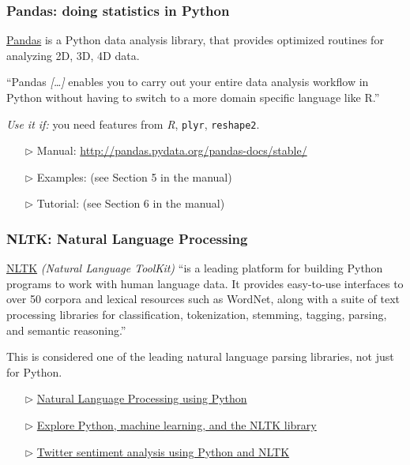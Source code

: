 \documentclass[english,serif,mathserif,xcolor=pdftex,dvipsnames,table]{beamer}
\begin{document}
\begin{frame}[fragile]
  \frametitle{Pandas: doing statistics in Python}

  \href{http://pandas.pydata.org/}{Pandas} is a Python data analysis
  library, that provides optimized routines for analyzing 2D, 3D, 4D
  data.

  \+ ``Pandas \emph{[\ldots]} enables you to carry out your entire
  data analysis workflow in Python without having to switch to a more
  domain specific language like R.''

  \+ \emph{Use it if:} you need features from \emph{R}, \texttt{plyr},
  \texttt{reshape2}.

  \+
  \begin{itemize}
  \item[$\triangleright$] Manual: {\footnotesize\url{http://pandas.pydata.org/pandas-docs/stable/}}
  \item[$\triangleright$] Examples: {\footnotesize (see Section 5 in the manual)}
  \item[$\triangleright$] Tutorial: {\footnotesize (see Section 6 in the manual)}
  \end{itemize}
\end{frame}


\begin{frame}[fragile]
  \frametitle{NLTK: Natural Language Processing}

  \href{http://nltk.org/}{NLTK} \emph{(Natural Language ToolKit)} ``is
  a leading platform for building Python programs to work with human
  language data. It provides easy-to-use interfaces to over 50 corpora
  and lexical resources such as WordNet, along with a suite of text
  processing libraries for classification, tokenization, stemming,
  tagging, parsing, and semantic reasoning.''

  \+ This is considered one of the leading natural language parsing
  libraries, not just for Python.

  \begin{seealso}
    \footnotesize
    \begin{itemize}
    \item[$\triangleright$]  \href{http://okfnlabs.org/blog/2013/11/11/python-nlp.html}{Natural Language Processing using Python}
    \item[$\triangleright$]  \href{http://www.ibm.com/developerworks/linux/library/os-pythonnltk/index.html}{Explore Python, machine learning, and the NLTK library}
    \item[$\triangleright$]  \href{http://www.laurentluce.com/posts/twitter-sentiment-analysis-using-python-and-nltk/}{Twitter sentiment analysis using Python and NLTK}
    \end{itemize}
  \end{seealso}
\end{frame}
\end{document}
